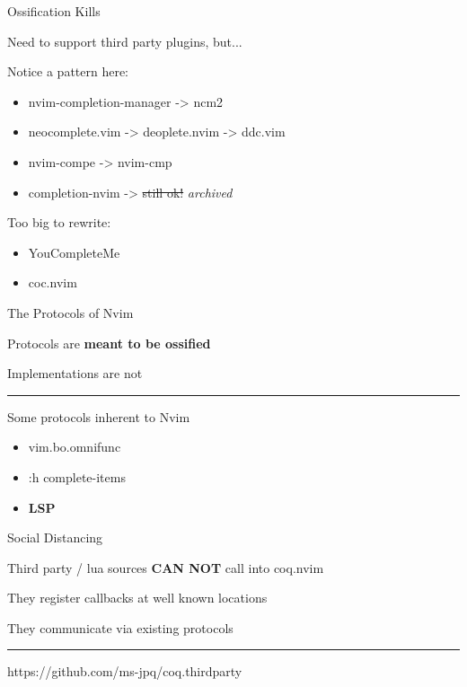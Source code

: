 \documentclass{beamer}
\begin{document}
\begin{frame}{Ossification Kills}

	Need to support third party plugins, but...

	Notice a pattern here:

	\begin{itemize}

		\item nvim-completion-manager -> ncm2

		\item neocomplete.vim -> deoplete.nvim -> ddc.vim

		\item nvim-compe -> nvim-cmp

		\item completion-nvim -> \st{still ok!} \textit{archived}

	\end{itemize}

	Too big to rewrite:

	\begin{itemize}

		\item YouCompleteMe

		\item coc.nvim

	\end{itemize}

\end{frame}


\begin{frame}{The Protocols of Nvim}

	Protocols are \textbf{meant to be ossified}

	Implementations are not

	\rule{\textwidth}{0.1em}

	Some protocols inherent to Nvim

	\begin{itemize}

		\item vim.bo.omnifunc

		\item :h complete-items

		\item \textbf{LSP}

	\end{itemize}

\end{frame}


\begin{frame}{Social Distancing}

	Third party / lua sources \textbf{CAN NOT} call into coq.nvim

	They register callbacks at well known locations

	They communicate via existing protocols

	\rule{\textwidth}{0.1em}

	https://github.com/ms-jpq/coq.thirdparty

\end{frame}
\end{document}
